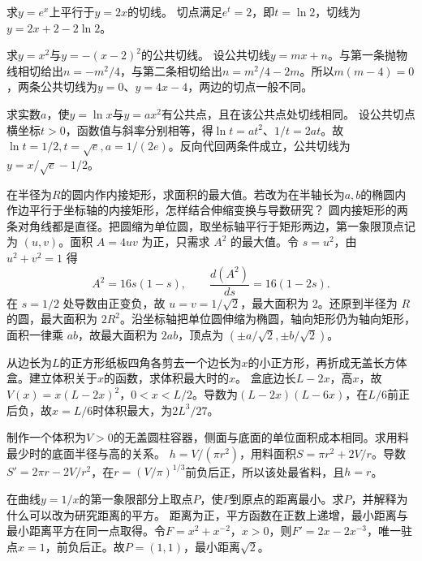 求\(y=e^x\)上平行于\(y=2x\)的切线。
\solutionanswer
切点满足\(e^t=2\)，即\(t=\ln2\)，切线为\(y=2x+2-2\ln2\)。


求\(y=x^2\)与\(y=-(x-2)^2\)的公共切线。
\solutionanswer
设公共切线\(y=mx+n\)。与第一条抛物线相切给出\(n=-m^2/4\)，与第二条相切给出\(n=m^2/4-2m\)。所以\(m(m-4)=0\)，两条公共切线为\(y=0\)、\(y=4x-4\)，两边的切点一般不同。


求实数\(a\)，使\(y=\ln x\)与\(y=ax^2\)有公共点，且在该公共点处切线相同。
\solutionanswer
设公共切点横坐标\(t>0\)，函数值与斜率分别相等，得\(\ln t=at^2\)、\(1/t=2at\)。故\(\ln t=1/2,t=\sqrt e,a=1/(2e)\)。反向代回两条件成立，公共切线为\(y=x/\sqrt e-1/2\)。


在半径为\(R\)的圆内作内接矩形，求面积的最大值。若改为在半轴长为\(a,b\)的椭圆内作边平行于坐标轴的内接矩形，怎样结合伸缩变换与导数研究？
\solutionanswer
圆内接矩形的两条对角线都是直径。把圆缩为单位圆，取坐标轴平行于矩形两边，第一象限顶点记为 \((u,v)\)。面积 \(A=4uv\) 为正，只需求 \(A^2\) 的最大值。令 \(s=u^2\)，由 \(u^2+v^2=1\) 得
\[
 A^2=16s(1-s),\qquad \frac{d(A^2)}{ds}=16(1-2s).
\]
在 \(s=1/2\) 处导数由正变负，故 \(u=v=1/\sqrt2\)，最大面积为 \(2\)。还原到半径为 \(R\) 的圆，最大面积为 \(2R^2\)。沿坐标轴把单位圆伸缩为椭圆，轴向矩形仍为轴向矩形，面积一律乘 \(ab\)，故最大面积为 \(2ab\)，顶点为 \((\pm a/\sqrt2,\pm b/\sqrt2)\)。


从边长为\(L\)的正方形纸板四角各剪去一个边长为\(x\)的小正方形，再折成无盖长方体盒。建立体积关于\(x\)的函数，求体积最大时的\(x\)。
\solutionanswer
盒底边长\(L-2x\)，高\(x\)，故\(V(x)=x(L-2x)^2\)，\(0<x<L/2\)。导数为\((L-2x)(L-6x)\)，在\(L/6\)前正后负，故\(x=L/6\)时体积最大，为\(2L^3/27\)。


制作一个体积为\(V>0\)的无盖圆柱容器，侧面与底面的单位面积成本相同。求用料最少时的底面半径与高的关系。
\solutionanswer
\(h=V/(\pi r^2)\)，用料面积\(S=\pi r^2+2V/r\)。导数\(S'=2\pi r-2V/r^2\)，在\(r=(V/\pi)^{1/3}\)前负后正，所以该处最省料，且\(h=r\)。


在曲线\(y=1/x\)的第一象限部分上取点\(P\)，使\(P\)到原点的距离最小。求\(P\)，并解释为什么可以改为研究距离的平方。
\solutionanswer
距离为正，平方函数在正数上递增，最小距离与最小距离平方在同一点取得。令\(F=x^2+x^{-2}\)，\(x>0\)，则\(F'=2x-2x^{-3}\)，唯一驻点\(x=1\)，前负后正。故\(P=(1,1)\)，最小距离\(\sqrt2\)。



